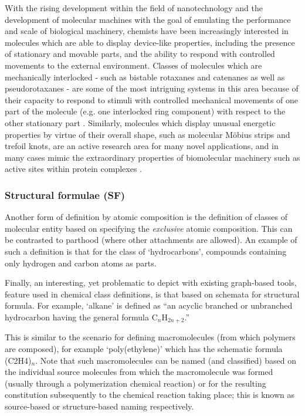 \documentclass[10pt]{bmc_article}
\newenvironment{bmcformat}{\baselineskip20pt\sloppy\setboolean{publ}{false}}{\baselineskip20pt\sloppy}
\begin{document}
\begin{bmcformat}
With the rising development within the field of nanotechnology and the development of molecular machines with the goal of emulating the performance and scale of biological machinery, chemists have been increasingly interested in molecules which are able to display device-like properties, including the presence of stationary and movable parts, and the ability to respond with controlled movements to the external environment. Classes of molecules which are mechanically interlocked  - such as bistable rotaxanes and catenanes as well as pseudorotaxanes - are some of the most intriguing systems in this area because of their capacity to respond to stimuli with controlled mechanical movements of one part of the molecule (e.g. one interlocked ring component) with respect to the other stationary part \cite{stoddart2011}.  Similarly, molecules which display unusual energetic properties by virtue of their overall shape, such as molecular M\"{o}bius strips and trefoil knots, are an active research area for many novel applications, and in many cases mimic the extraordinary properties of biomolecular machinery such as active sites within protein complexes \cite{rzepa2009a,rzepa2009b}.  



\subsubsection*{Structural formulae (SF)}
\label{sec:molformula}

Another form of definition by atomic composition is the definition of classes of molecular entity based on specifying the \textit{exclusive} atomic composition.  This can be contrasted to parthood (where other attachments are allowed).  An example of such a definition is that for the class of `hydrocarbons', compounds containing only hydrogen and carbon atoms as parts. 

Finally, an interesting, yet problematic to depict with existing graph-based tools, feature used in chemical class definitions, is that based on schemata for structural formula.  For example, `alkane' is defined as ``an acyclic branched or unbranched hydrocarbon having the general formula C$_{n}$H$_{2n+2}$.'' 

This is similar to the scenario for defining macromolecules (from which polymers are composed), for example `poly(ethylene)' which has the schematic formula (C2H4)$_{n}$. Note that such macromolecules can be named (and classified) based on the individual source molecules from which the macromolecule was formed (usually through a polymerization chemical reaction) or for the resulting constitution subsequently to the chemical reaction taking place; this is known as source-based or structure-based naming respectively.  %


\end{bmcformat}
\end{document}
